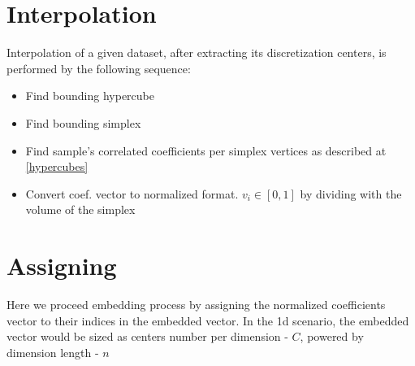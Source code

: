 \section{Interpolation}

Interpolation of a given dataset, after extracting its discretization centers, is performed by the following sequence:

\begin{itemize}
\item Find bounding hypercube
\item Find bounding simplex
\item Find sample’s correlated coefficients per simplex vertices as described at \ref{hypercubes}
\item Convert coef. vector to  normalized format. $v_i \in [0,1]$  by dividing with the volume of the simplex
\end{itemize}

\section{Assigning}

Here we proceed embedding process by assigning the normalized coefficients vector to their indices in the embedded vector.
In the 1d scenario, the embedded vector would be sized as centers number per dimension - $C$, powered by dimension length - $n$



